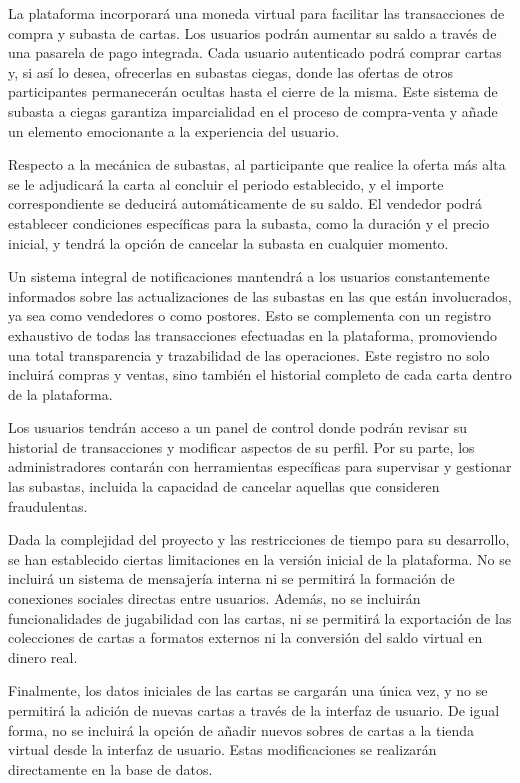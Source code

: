 La plataforma incorporará una moneda virtual para facilitar las transacciones de compra y subasta de cartas. Los usuarios podrán aumentar su saldo a través de una pasarela de pago integrada. 
Cada usuario autenticado podrá comprar cartas y, si así lo desea, ofrecerlas en subastas ciegas, donde las ofertas de otros participantes permanecerán ocultas hasta el cierre de la misma. 
Este sistema de subasta a ciegas garantiza imparcialidad en el proceso de compra-venta y añade un elemento emocionante a la experiencia del usuario. 


Respecto a la mecánica de subastas, al participante que realice la oferta más alta se le adjudicará la carta al concluir el periodo establecido, y el importe correspondiente se deducirá 
automáticamente de su saldo. El vendedor podrá establecer condiciones específicas para la subasta, como la duración y el precio inicial, y 
tendrá la opción de cancelar la subasta en cualquier momento.


Un sistema integral de notificaciones mantendrá a los usuarios constantemente informados sobre las actualizaciones de las subastas en las que están involucrados, 
ya sea como vendedores o como postores. Esto se complementa con un registro exhaustivo de todas las transacciones efectuadas en la plataforma, promoviendo una total transparencia y trazabilidad 
de las operaciones. Este registro no solo incluirá compras y ventas, sino también el historial completo de cada carta dentro de la plataforma.


Los usuarios tendrán acceso a un panel de control donde podrán revisar su historial de transacciones y modificar aspectos de su perfil. 
Por su parte, los administradores contarán con herramientas específicas para supervisar y gestionar las subastas, incluida la capacidad de cancelar aquellas que consideren fraudulentas.


Dada la complejidad del proyecto y las restricciones de tiempo para su desarrollo, se han establecido ciertas limitaciones en la versión inicial de la plataforma.
No se incluirá un sistema de mensajería interna ni se permitirá la formación de conexiones sociales directas entre usuarios. 
Además, no se incluirán funcionalidades de jugabilidad con las cartas, ni se permitirá la exportación de las colecciones de cartas a formatos externos ni la conversión del saldo virtual en dinero real.


Finalmente, los datos iniciales de las cartas se cargarán una única vez, y no se permitirá la adición de nuevas cartas a través de la interfaz de usuario. 
De igual forma, no se incluirá la opción de añadir nuevos sobres de cartas a la tienda virtual desde la interfaz de usuario. Estas modificaciones se realizarán directamente en la base de datos.


